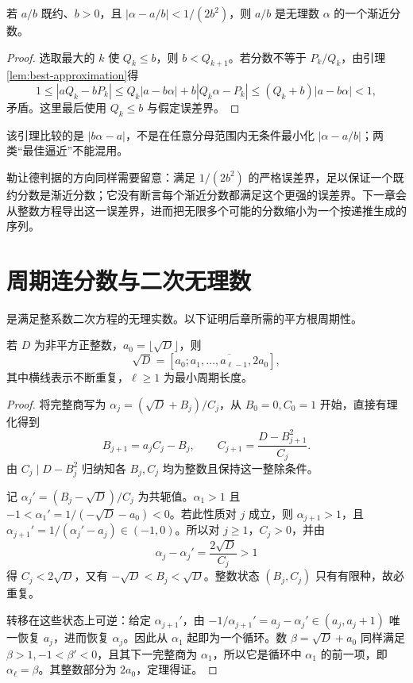 \documentclass[UTF8,12pt,a4paper,fontset=fandol]{ctexbook}
\begin{document}
\begin{theorem}
\label{thm:legendre-approximation}
若 $a/b$ 既约、$b>0$，且 $|\alpha-a/b|<1/(2b^2)$，则 $a/b$ 是无理数 $\alpha$ 的一个渐近分数。
\end{theorem}
\begin{proof}
选取最大的 $k$ 使 $Q_k\le b$，则 $b<Q_{k+1}$。若分数不等于 $P_k/Q_k$，由引理\ref{lem:best-approximation}得
\[
 1\le|aQ_k-bP_k|
 \le Q_k|a-b\alpha|+b|Q_k\alpha-P_k|
 \le(Q_k+b)|a-b\alpha|<1,
\]
矛盾。这里最后使用 $Q_k\le b$ 与假定误差界。
\end{proof}

该引理比较的是 $|b\alpha-a|$，不是在任意分母范围内无条件最小化 $|\alpha-a/b|$；两类“最佳逼近”不能混用。

勒让德判据的方向同样需要留意：满足 $1/(2b^2)$ 的严格误差界，足以保证一个既约分数是渐近分数；它没有断言每个渐近分数都满足这个更强的误差界。下一章会从整数方程导出这一误差界，进而把无限多个可能的分数缩小为一个按递推生成的序列。

\section{周期连分数与二次无理数}

是满足整系数二次方程的无理实数。以下证明后章所需的平方根周期性。

\begin{theorem}[平方根的周期展开]
\label{thm:sqrt-period}
若 $D$ 为非平方正整数，$a_0=\lfloor\sqrt D\rfloor$，则
\[
 \sqrt D=[a_0;\overline{a_1,\ldots,a_{\ell-1},2a_0}],
\]
其中横线表示不断重复，$\ell\ge1$ 为最小周期长度。
\end{theorem}
\begin{proof}
将完整商写为 $\alpha_j=(\sqrt D+B_j)/C_j$，从 $B_0=0,C_0=1$ 开始，直接有理化得到
\begin{equation}
 B_{j+1}=a_jC_j-B_j,\qquad
 C_{j+1}=\frac{D-B_{j+1}^2}{C_j}.
 \label{eq:surd-recurrence}
\end{equation}
由 $C_j\mid D-B_j^2$ 归纳知各 $B_j,C_j$ 均为整数且保持这一整除条件。

记 $\alpha_j'=(B_j-\sqrt D)/C_j$ 为共轭值。$\alpha_1>1$ 且 $-1<\alpha_1'=1/(-\sqrt D-a_0)<0$。若此性质对 $j$ 成立，则 $\alpha_{j+1}>1$，且 $\alpha_{j+1}'=1/(\alpha_j'-a_j)\in(-1,0)$。所以对 $j\ge1$，$C_j>0$，并由
\[
 \alpha_j-\alpha_j'=\frac{2\sqrt D}{C_j}>1
\]
得 $C_j<2\sqrt D$，又有 $-\sqrt D<B_j<\sqrt D$。整数状态 $(B_j,C_j)$ 只有有限种，故必重复。

转移在这些状态上可逆：给定 $\alpha_{j+1}'$，由 $-1/\alpha_{j+1}'=a_j-\alpha_j'\in(a_j,a_j+1)$ 唯一恢复 $a_j$，进而恢复 $\alpha_j$。因此从 $\alpha_1$ 起即为一个循环。数 $\beta=\sqrt D+a_0$ 同样满足 $\beta>1,-1<\beta'<0$，且其下一完整商为 $\alpha_1$，所以它是循环中 $\alpha_1$ 的前一项，即 $\alpha_\ell=\beta$。其整数部分为 $2a_0$，定理得证。
\end{proof}
\end{document}
